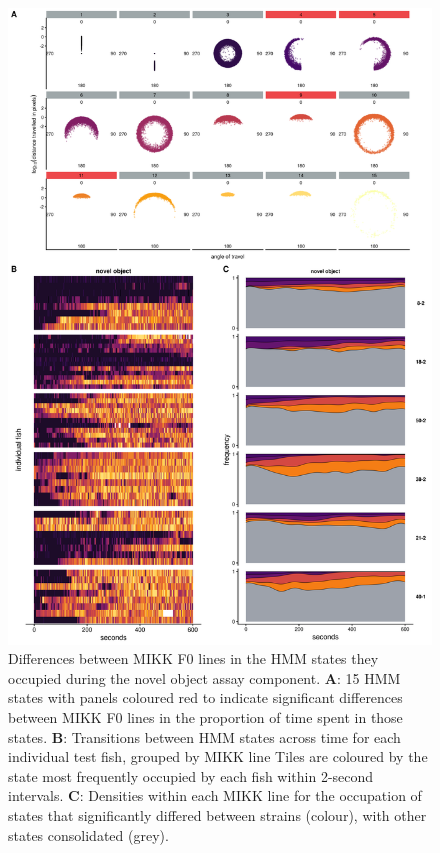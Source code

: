\documentclass[
]{article}
\begin{document}
\begin{figure}
\includegraphics[width=1\linewidth]{figs/mikk_behaviour/select_0.08_15_sge_no} \caption{Differences between MIKK F0 lines in the HMM states they occupied during the novel object assay component. \textbf{A}: 15 HMM states with panels coloured red to indicate significant differences between MIKK F0 lines in the proportion of time spent in those states. \textbf{B}: Transitions between HMM states across time for each individual test fish, grouped by MIKK line Tiles are coloured by the state most frequently occupied by each fish within 2-second intervals. \textbf{C}: Densities within each MIKK line for the occupation of states that significantly differed between strains (colour), with other states consolidated (grey).}\label{fig:F2-time-sge-no}
\end{figure}
\end{document}
